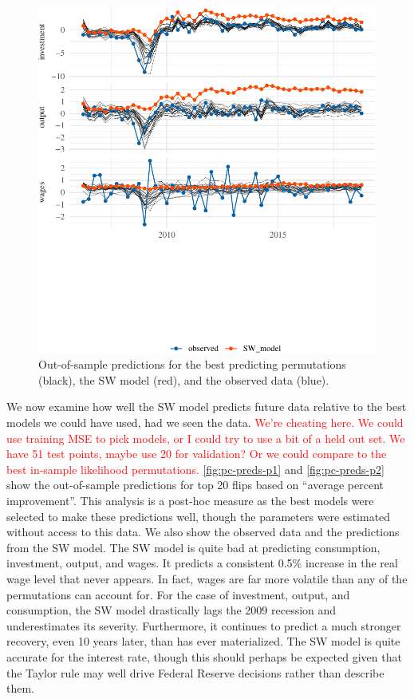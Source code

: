 \documentclass[11pt]{article}
\newcommand{\attn}[1]{\textcolor{red}{#1}}
\begin{document}
\begin{figure}[t]

{\centering \includegraphics{gfx/pc-preds-p2-1} 

}

\caption{Out-of-sample predictions for the best predicting permutations (black), the SW model (red), and the observed data (blue).}\label{fig:pc-preds-p2}
\end{figure}

We now examine how well the SW model predicts future data relative to
the best models we could have used, had we seen the data.
\attn{We're cheating here. We could use training MSE to pick models, or I could try to use a bit of a held out set. We have 51 test points, maybe use 20 for validation? Or we could compare to the best in-sample likelihood permutations.}
\autoref{fig:pc-preds-p1} and \autoref{fig:pc-preds-p2} show the
out-of-sample predictions for top 20 flips based on ``average percent
improvement''. This analysis is a post-hoc measure as the best models
were selected to make these predictions well, though the parameters were
estimated without access to this data. We also show the observed data
and the predictions from the SW model. The SW model is quite bad at
predicting consumption, investment, output, and wages. It predicts a
consistent 0.5\% increase in the real wage level that never appears. In
fact, wages are far more volatile than any of the permutations can
account for. For the case of investment, output, and consumption, the SW
model drastically lags the 2009 recession and underestimates its
severity. Furthermore, it continues to predict a much stronger recovery,
even 10 years later, than has ever materialized. The SW model is quite
accurate for the interest rate, though this should perhaps be expected
given that the Taylor rule may well drive Federal Reserve decisions
rather than describe them.
\end{document}
